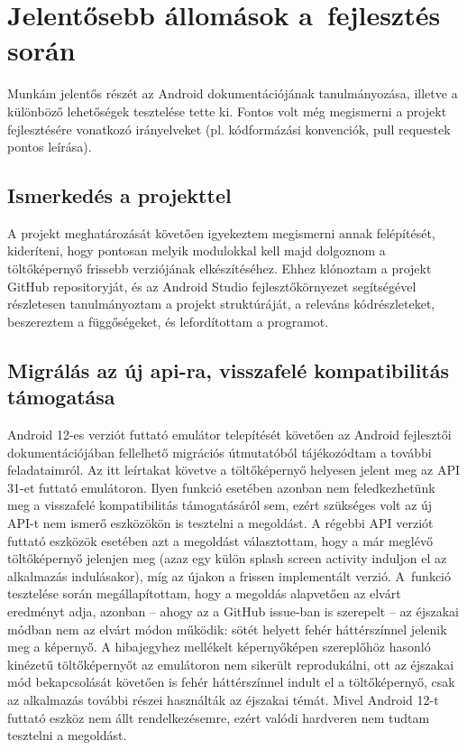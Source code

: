 \chapter{Jelentősebb állomások a~fejlesztés során}
Munkám jelentős részét az Android dokumentációjának tanulmányozása, illetve a különböző lehetőségek
tesztelése tette ki. Fontos volt még megismerni a projekt fejlesztésére vonatkozó irányelveket
(pl. kódformázási konvenciók, pull requestek pontos leírása).

\section{Ismerkedés a projekttel}
A projekt meghatározását követően igyekeztem megismerni annak felépítését, kideríteni, hogy
pontosan melyik modulokkal kell majd dolgoznom a töltőképernyő frissebb verziójának elkészítéséhez.
Ehhez klónoztam a projekt GitHub repositoryját, és az Android Studio fejlesztőkörnyezet
segítségével részletesen tanulmányoztam a projekt struktúráját, a releváns kódrészleteket,
beszereztem a függőségeket, és lefordítottam a programot.

\section{Migrálás az új \acrshort{api}-ra, visszafelé kompatibilitás támogatása}
Android 12-es verziót futtató emulátor telepítését követően az Android fejlesztői
dokumentációjában fellelhető migrációs útmutatóból tájékozódtam a további feladataimról.
Az itt leírtakat követve a töltőképernyő helyesen jelent meg az API 31-et futtató emulátoron.
Ilyen funkció esetében azonban nem feledkezhetünk meg a visszafelé kompatibilitás támogatásáról
sem, ezért szükséges volt az új API-t nem ismerő eszközökön is tesztelni a megoldást.
A régebbi API verziót futtató eszközök esetében azt a megoldást választottam, hogy a már meglévő
töltőképernyő jelenjen meg (azaz egy külön splash screen activity induljon el az alkalmazás
indulásakor), míg az újakon a frissen implementált verzió. A~funkció tesztelése során
megállapítottam, hogy a megoldás alapvetően az elvárt eredményt adja, azonban -- ahogy az a
GitHub issue-ban is szerepelt -- az éjszakai módban nem az elvárt módon működik: sötét helyett
fehér háttérszínnel jelenik meg a képernyő. A hibajegyhez mellékelt képernyőképen szereplőhöz
hasonló kinézetű töltőképernyőt az emulátoron nem sikerült reprodukálni, ott az éjszakai mód
bekapcsolását követően is fehér háttérszínnel indult el a töltőképernyő, csak az alkalmazás
további részei használták az éjszakai témát. Mivel Android 12-t futtató eszköz nem állt
rendelkezésemre, ezért valódi hardveren nem tudtam tesztelni a megoldást.

